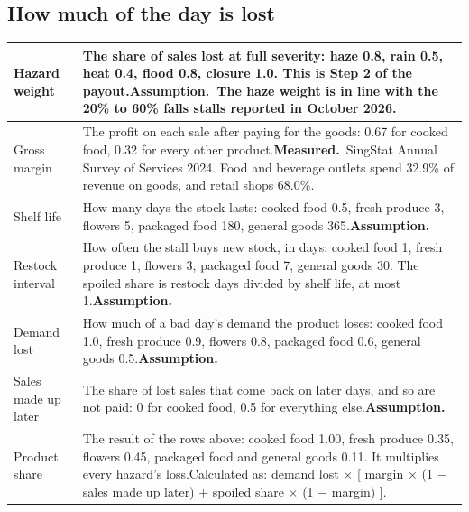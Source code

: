 \documentclass[11pt,a4paper]{article}
\newcommand{\measured}{\textcolor{measured}{\textbf{Measured.}}}
\newcommand{\assumed}{\textcolor{assumed}{\textbf{Assumption.}}}
\begin{document}
\subsection{How much of the day is lost}

{\small
\begin{xltabular}{\textwidth}{|K{3.4cm}|Y|}
\hline
Hazard weight & The share of sales lost at full severity: haze 0.8, rain 0.5, heat 0.4, flood 0.8, closure 1.0. This is Step 2 of the payout.\newline \assumed\ The haze weight is in line with the 20\% to 60\% falls stalls reported in October 2026.\cite{st-haze} \\
\hline
Gross margin & The profit on each sale after paying for the goods: 0.67 for cooked food, 0.32 for every other product.\newline \measured\ SingStat Annual Survey of Services 2024. Food and beverage outlets spend 32.9\% of revenue on goods, and retail shops 68.0\%.\cite{singstat} \\
\hline
Shelf life & How many days the stock lasts: cooked food 0.5, fresh produce 3, flowers 5, packaged food 180, general goods 365.\newline \assumed \\
\hline
Restock interval & How often the stall buys new stock, in days: cooked food 1, fresh produce 1, flowers 3, packaged food 7, general goods 30. The spoiled share is restock days divided by shelf life, at most 1.\newline \assumed \\
\hline
Demand lost & How much of a bad day's demand the product loses: cooked food 1.0, fresh produce 0.9, flowers 0.8, packaged food 0.6, general goods 0.5.\newline \assumed \\
\hline
Sales made up later & The share of lost sales that come back on later days, and so are not paid: 0 for cooked food, 0.5 for everything else.\newline \assumed \\
\hline
Product share & The result of the rows above: cooked food 1.00, fresh produce 0.35, flowers 0.45, packaged food and general goods 0.11. It multiplies every hazard's loss.\newline Calculated as: demand lost $\times$ [ margin $\times$ (1 $-$ sales made up later) $+$ spoiled share $\times$ (1 $-$ margin) ]. \\
\hline
\end{xltabular}}
\end{document}

